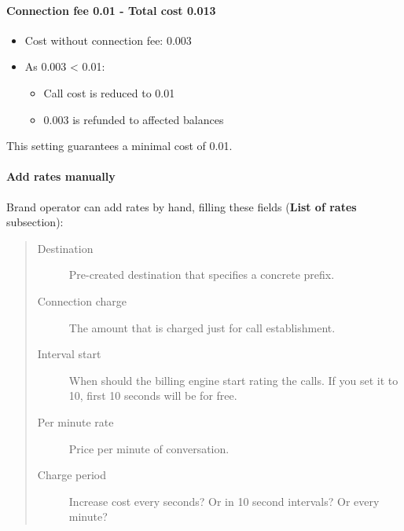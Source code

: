 \documentclass[letterpaper,10pt,english]{sphinxmanual}
\begin{document}
\paragraph{Connection fee 0.01 - Total cost 0.013}
\begin{itemize}
\item {} 
Cost without connection fee: 0.003

\item {} 
As 0.003 \textless{} 0.01:
\begin{itemize}
\item {} 
Call cost is reduced to 0.01

\item {} 
0.003 is refunded to affected balances

\end{itemize}

\end{itemize}

This setting guarantees a minimal cost of 0.01.


\paragraph{Add rates manually}
\label{administration_portal/brand/billing/destination_rates:add-rates-manually}\label{administration_portal/brand/billing/destination_rates:id2}
Brand operator can add rates by hand, filling these fields (\textbf{List of rates} subsection):
\begin{quote}
\begin{description}
\item[{Destination}] \leavevmode
Pre-created destination that specifies a concrete prefix.

\item[{Connection charge}] \leavevmode
The amount that is charged just for call establishment.

\item[{Interval start}] \leavevmode
When should the billing engine start rating the calls. If you set it to 10, first 10 seconds will be for free.

\item[{Per minute rate}] \leavevmode
Price per minute of conversation.

\item[{Charge period}] \leavevmode
Increase cost every seconds? Or in 10 second intervals? Or every minute?

\end{description}
\end{quote}
\end{document}
